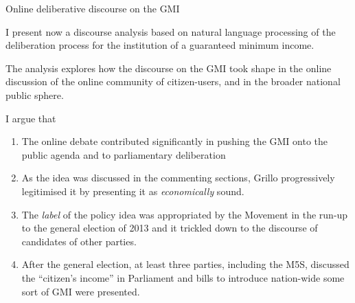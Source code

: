 \documentclass[serif, aspectratio=169]{beamer}
\begin{document}
\begin{frame}
{Online deliberative discourse on the GMI}

I present now a discourse analysis based on natural language processing of the deliberation process for the institution of a guaranteed minimum income.

The analysis explores how the discourse on the GMI took shape in the online discussion of the online community of citizen-users, and in the broader national public sphere.

\end{frame}

\begin{frame}

I argue that

\begin{enumerate}

\item The online debate contributed significantly in pushing the GMI onto the public agenda and to parliamentary deliberation

\item  As the idea was discussed in the commenting sections, Grillo progressively legitimised it by presenting it as \textit{economically} sound. 

\item  The \textit{label} of the policy idea was appropriated by the Movement in the run-up to the general election of 2013 and it trickled down to the discourse of candidates of other parties. 

\item After the general election, at least three parties, including the M5S, discussed the \enquote{citizen's income} in Parliament and bills to introduce nation-wide some sort of GMI were presented.

\end{enumerate}

\end{frame}
\end{document}
